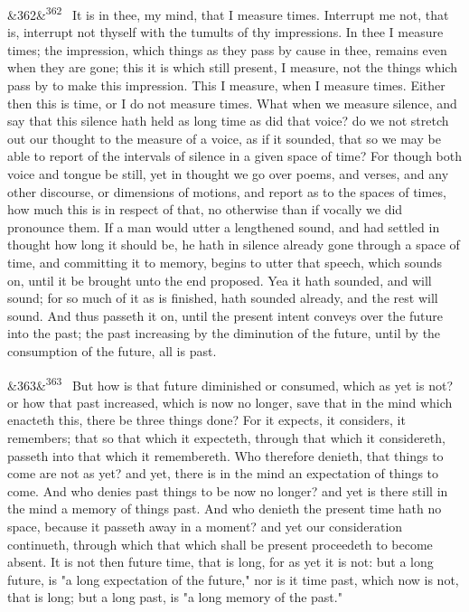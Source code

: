 \documentclass[12pt]{article}
\newcommand{\para}[1][]{\par\noindent\ifx&#1&\else\textsuperscript{\footnotesize #1}~\fi}
\begin{document}
\para[362] It is in thee, my mind, that I measure times. Interrupt me not, that is, interrupt not thyself with the tumults of thy impressions. In thee I measure times; the impression, which things as they pass by cause in thee, remains even when they are gone; this it is which still present, I measure, not the things which pass by to make this impression. This I measure, when I measure times. Either then this is time, or I do not measure times. What when we measure silence, and say that this silence hath held as long time as did that voice? do we not stretch out our thought to the measure of a voice, as if it sounded, that so we may be able to report of the intervals of silence in a given space of time? For though both voice and tongue be still, yet in thought we go over poems, and verses, and any other discourse, or dimensions of motions, and report as to the spaces of times, how much this is in respect of that, no otherwise than if vocally we did pronounce them. If a man would utter a lengthened sound, and had settled in thought how long it should be, he hath in silence already gone through a space of time, and committing it to memory, begins to utter that speech, which sounds on, until it be brought unto the end proposed. Yea it hath sounded, and will sound; for so much of it as is finished, hath sounded already, and the rest will sound. And thus passeth it on, until the present intent conveys over the future into the past; the past increasing by the diminution of the future, until by the consumption of the future, all is past.

\para[363] But how is that future diminished or consumed, which as yet is not? or how that past increased, which is now no longer, save that in the mind which enacteth this, there be three things done? For it expects, it considers, it remembers; that so that which it expecteth, through that which it considereth, passeth into that which it remembereth. Who therefore denieth, that things to come are not as yet? and yet, there is in the mind an expectation of things to come. And who denies past things to be now no longer? and yet is there still in the mind a memory of things past. And who denieth the present time hath no space, because it passeth away in a moment? and yet our consideration continueth, through which that which shall be present proceedeth to become absent. It is not then future time, that is long, for as yet it is not: but a long future, is "a long expectation of the future," nor is it time past, which now is not, that is long; but a long past, is "a long memory of the past."
\end{document}
